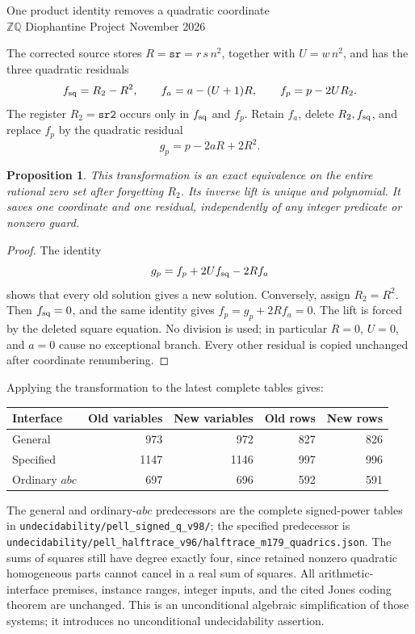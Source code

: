 \documentclass[11pt]{article}
\newtheorem*{proposition}{Proposition}
\begin{document}
\begin{center}
{\Large One product identity removes a quadratic coordinate}\\[6pt]
\(\mathbb Z\mathbb Q\) Diophantine Project November 2026
\end{center}

The corrected source stores \(R=\texttt{sr}=r\,s\,n^2\), together
with \(U=w\,n^2\), and has the three quadratic residuals
\[
 f_{\rm sq}=R_2-R^2,\qquad
 f_a=a-(U+1)R,\qquad f_p=p-2UR_2.
\]
The register \(R_2=\texttt{sr2}\) occurs only in \(f_{\rm sq}\)
and \(f_p\). Retain \(f_a\), delete \(R_2,f_{\rm sq}\), and replace
\(f_p\) by the quadratic residual
\[
                         g_p=p-2aR+2R^2.
\]

\begin{proposition}
This transformation is an exact equivalence on the entire rational
zero set after forgetting \(R_2\). Its inverse lift is unique and
polynomial. It saves one coordinate and one residual, independently
of any integer predicate or nonzero guard.
\end{proposition}
\begin{proof}
The identity
\[
                  g_p=f_p+2U f_{\rm sq}-2R f_a
\]
shows that every old solution gives a new solution. Conversely,
assign \(R_2=R^2\). Then \(f_{\rm sq}=0\), and the same identity
gives \(f_p=g_p+2R f_a=0\). The lift is forced by the deleted
square equation. No division is used; in particular \(R=0\),
\(U=0\), and \(a=0\) cause no exceptional branch. Every other
residual is copied unchanged after coordinate renumbering.
\end{proof}

Applying the transformation to the latest complete tables gives:
\begin{center}
\begin{tabular}{lrrrr}
\toprule
Interface & Old variables & New variables & Old rows & New rows\\
\midrule
General & 973 & 972 & 827 & 826\\
Specified & 1147 & 1146 & 997 & 996\\
Ordinary \(abc\) & 697 & 696 & 592 & 591\\
\bottomrule
\end{tabular}
\end{center}
The general and ordinary-\(abc\) predecessors are the complete
signed-power tables in \nolinkurl{undecidability/pell_signed_q_v98/};
the specified predecessor is
\nolinkurl{undecidability/pell_halftrace_v96/halftrace_m179_quadrics.json}.
The sums of squares still have degree exactly four, since retained
nonzero quadratic homogeneous parts cannot cancel in a real sum of
squares. All arithmetic-interface premises, instance ranges, integer
inputs, and the cited Jones coding theorem are unchanged. This is an
unconditional algebraic simplification of those systems; it introduces
no unconditional undecidability assertion.
\end{document}
